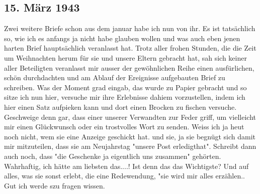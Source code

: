 \subsection{15. M\"{a}rz 1943}

Zwei weitere Briefe schon aus dem januar habe ich nun von ihr.
Es ist tats\"{a}chlich so, wie ich es anfangs ja nicht habe glauben wollen und was auch eben jenen harten Brief haupts\"{a}chlich veranlasst hat.
Trotz aller frohen Stunden, die die Zeit um Weihnachten herum f\"{u}r sie und unsere Eltern gebracht hat, sah sich keiner aller Beteiligten veranlasst mir ausser der gew\"{o}hnlichen Reihe einen ausf\"{u}rlichen, sch\"{o}n durchdachten und am Ablauf der Ereignisse aufgebauten Brief zu schreiben.
Was der Moment grad eingab, das wurde zu Papier gebracht und so sitze ich nun hier, versuche mir ihre Erlebnisse dahiem vorzustellen, indem ich hier einen Satz aufpieken kann und dort einen Brocken zu fischen versuche.
Geschweige denn gar, dass einer unserer Verwandten zur Feder griff, um vielleicht mir einen Gl\"{u}ckwunsch oder ein trostvolles Wort zu senden.
Weiss ich ja heut noch nicht, wem sie eine Anzeige geschickt hat.
und sie, ja sie begn\"{u}gt sich damit mir mitzuteilen, dass sie am Neujahrstag "unsere Post erledigthat".
Schreibt dann auch noch, dass "die Geschenke ja eigentlich uns zusammen" geh\"{o}rten.
Wahrhaftig, ich h\"{a}tte am liebsten das....!
Ist denn das das Wichtigste?
Und auf alles, was sie sonst erlebt, die eine Redewendung, "sie wird mir alles erz\"{a}hlen.. Gut ich werde szu fragen wissen.
\clearpage
